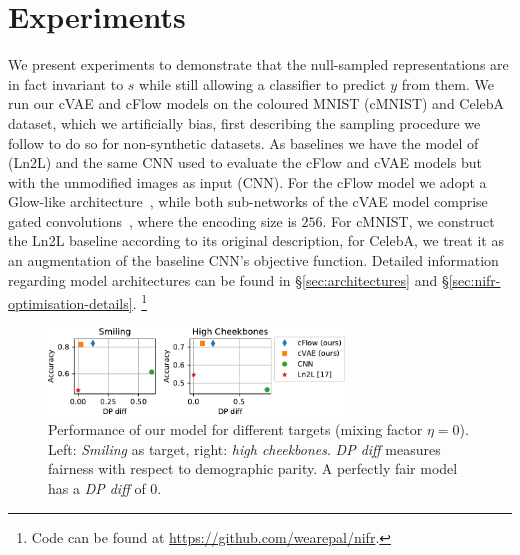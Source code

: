 %
\section{Experiments}
%
\noindent
%
We present experiments to demonstrate that the null-sampled representations are in fact invariant
to $s$ while still allowing a classifier to predict $y$ from them. 
%
We run our \ac{cVAE} and \ac{cFlow} models on the coloured MNIST (cMNIST) and CelebA dataset, which
we artificially bias, first describing the sampling procedure we follow to do so for non-synthetic
datasets. 
%
As baselines we have the model of~\citet{kim2019learning} (Ln2L) and the same \ac{CNN} used to
evaluate the \ac{cFlow} and \ac{cVAE} models but with the unmodified images as input (\acs{CNN}). 
%
For the \ac{cFlow} model we adopt a Glow-like architecture~\citep{KinDha18}, while both
sub-networks of the \ac{cVAE} model comprise gated convolutions~\citep{van2016conditional}, where
the encoding size is \(256\). 
%
For cMNIST, we construct the Ln2L baseline according to its original description, for CelebA, we
treat it as an augmentation of the baseline \ac{CNN}'s objective function.
Detailed information regarding model architectures can be found in \S\ref{sec:architectures} and
\S\ref{sec:nifr-optimisation-details}.
%
\footnote{
    Code can be found at \url{https://github.com/wearepal/nifr}.
}
%
\begin{figure}[tb]
    \centering
    \includegraphics[width=0.7\textwidth]{nifr/Figures/nosinn_celeba.pdf}
    \caption{
        Performance of our model for different targets (mixing factor $\eta=0$).
        Left: \emph{Smiling} as target, right: \emph{high cheekbones}.
        \emph{DP diff} measures fairness with respect to demographic parity.
        A perfectly fair model has a \emph{DP diff} of 0.
    }%
    \label{fig:celeba-targets}
\end{figure}

